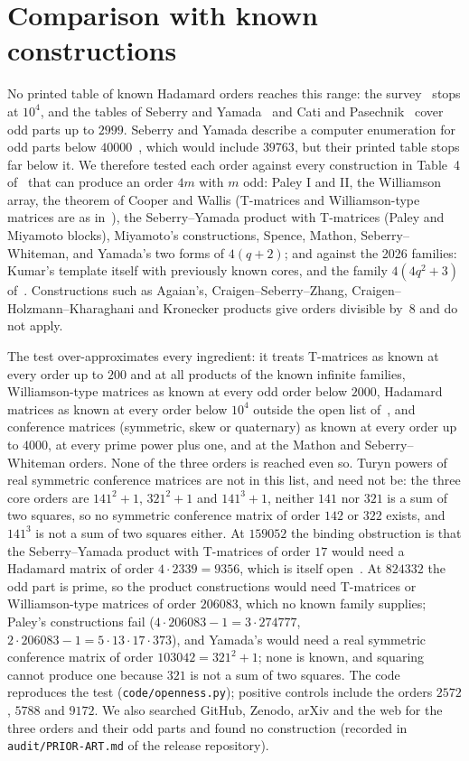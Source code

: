 \documentclass[10pt]{article}
\theoremstyle{remark}
\begin{document}
\section{Comparison with known constructions}\label{sec:new}
No printed table of known Hadamard orders reaches this range: the survey~\cite{EKLO} stops at $10^4$, and the tables of Seberry and Yamada~\cite{SY20} and Cati and Pasechnik~\cite{CP24} cover odd parts up to $2999$. Seberry and Yamada describe a computer enumeration for odd parts below $40000$~\cite{SY92}, which would include $39763$, but their printed table stops far below it. We therefore tested each order against every construction in Table~4 of~\cite{EKLO} that can produce an order $4m$ with $m$ odd: Paley I and II, the Williamson array, the theorem of Cooper and Wallis (T-matrices and Williamson-type matrices are as in~\cite{SY20}), the Seberry--Yamada product with T-matrices (Paley and Miyamoto blocks), Miyamoto's constructions, Spence, Mathon, Seberry--Whiteman, and Yamada's two forms of $4(q+2)$; and against the 2026 families: Kumar's template itself with previously known cores, and the family $4(4q^2+3)$ of~\cite[Theorem~7]{EKLO}. Constructions such as Agaian's, Craigen--Seberry--Zhang, Craigen--Holzmann--Kharaghani and Kronecker products give orders divisible by~$8$ and do not apply.

The test over-approximates every ingredient: it treats T-matrices as known at every order up to $200$ and at all products of the known infinite families, Williamson-type matrices as known at every odd order below $2000$, Hadamard matrices as known at every order below $10^4$ outside the open list of~\cite{EKLO}, and conference matrices (symmetric, skew or quaternary) as known at every order up to $4000$, at every prime power plus one, and at the Mathon and Seberry--Whiteman orders. None of the three orders is reached even so. Turyn powers of real symmetric conference matrices are not in this list, and need not be: the three core orders are $141^2+1$, $321^2+1$ and $141^3+1$, neither $141$ nor $321$ is a sum of two squares, so no symmetric conference matrix of order $142$ or $322$ exists, and $141^3$ is not a sum of two squares either. At $159052$ the binding obstruction is that the Seberry--Yamada product with T-matrices of order $17$ would need a Hadamard matrix of order $4\cdot2339=9356$, which is itself open~\cite{EKLO}. At $824332$ the odd part is prime, so the product constructions would need T-matrices or Williamson-type matrices of order $206083$, which no known family supplies; Paley's constructions fail ($4\cdot206083-1=3\cdot274777$, $2\cdot206083-1=5\cdot13\cdot17\cdot373$), and Yamada's would need a real symmetric conference matrix of order $103042=321^2+1$; none is known, and squaring cannot produce one because $321$ is not a sum of two squares. The code reproduces the test (\texttt{code/openness.py}); positive controls include the orders $2572$, $5788$ and $9172$. We also searched GitHub, Zenodo, arXiv and the web for the three orders and their odd parts and found no construction (recorded in \texttt{audit/PRIOR-ART.md} of the release repository).
\end{document}
